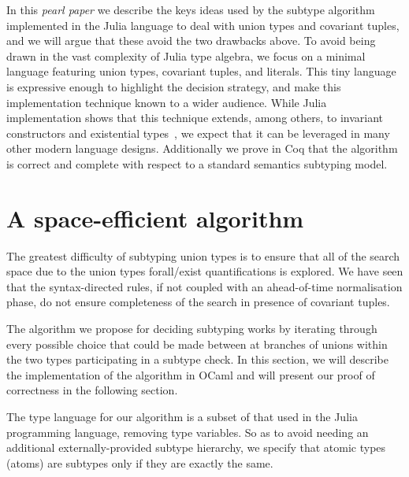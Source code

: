 \documentclass[a4paper,english]{lipics-v2018}
\begin{document}
In this \emph{pearl paper} we describe the keys ideas used by the
subtype algorithm implemented in the Julia language to deal with
union types and covariant tuples, and we will argue that these avoid the
two drawbacks above.  To avoid being drawn in the vast complexity of
Julia type algebra, we focus on a minimal language featuring union
types, covariant tuples, and literals.  This tiny language is
expressive enough to highlight the decision strategy, and make this
implementation technique known to a wider audience.  While Julia
implementation shows that this technique extends, among others, to
invariant constructors and existential
types~\cite{DBLP:journals/pacmpl/NardelliBPCBV18}, we expect that it
can be leveraged in many other modern language designs.  Additionally
we prove in Coq that the algorithm is correct and complete with
respect to a standard semantics subtyping model.


\section{A space-efficient algorithm}

The greatest difficulty of subtyping union types is to ensure that all of
the search space due to the union types forall/exist quantifications
is explored.  We have seen that the syntax-directed rules, if not
coupled with an ahead-of-time normalisation phase, do not ensure
completeness of the search in presence of covariant tuples.

The algorithm we propose for deciding subtyping works by iterating through every possible
choice that could be made between at branches of unions within the two types
participating in a subtype check. In this section, we will describe the
implementation of the algorithm in OCaml and will present our proof of
correctness in the following section.

The type language for our algorithm is a subset of that used in the Julia
programming language, removing type variables. So as to avoid needing an
additional externally-provided subtype hierarchy, we specify that atomic types
(atoms) are subtypes only if they are exactly the same.

\hspace{1em}
\end{document}
